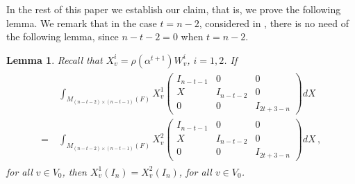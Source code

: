 \documentclass[12pt]{amsart}
\newtheorem{lem}[thm]{Lemma}
\begin{document}
In the rest of this paper we establish our claim, that is, we prove the following lemma.
We remark that in the case $t=n-2$, considered in \cite{Ch06}, there is no need of the following lemma, since $n-t-2=0$ when $t=n-2$. 

\begin{lem}\label{lem3}
Recall that $X_v^i= \rho(\alpha^{t+1}) W^i_{v}$, $i=1,2$. If 
\begin{align}\label{lem3equ1}
\begin{split}
& \int_{M_{(n-t-2) \times (n-t-1)}(F)} X^1_v \begin{pmatrix}
I_{n-t-1} & 0 & 0\\
X & I_{n-t-2} & 0\\
0 & 0 & I_{2t+3-n}
\end{pmatrix} dX \\
= \ & \int_{M_{(n-t-2) \times (n-t-1)}(F)} X^2_v \begin{pmatrix}
I_{n-t-1} & 0 & 0\\
X & I_{n-t-2} & 0\\
0 & 0 & I_{2t+3-n}
\end{pmatrix} dX\,,
\end{split}
\end{align} 
for all $v \in V_0$, 
then $X^1_v(I_n)=X^2_v(I_n)$, for all $v \in V_0$.
\end{lem}
\end{document}
